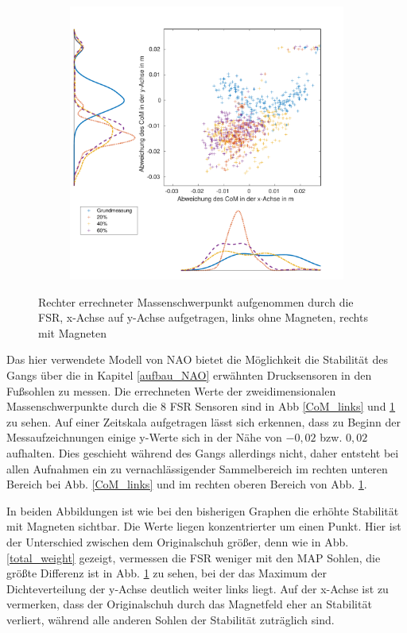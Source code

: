 \begin{figure}[tb]
\begin{adjustwidth}{-0.2\linewidth}{-0.2\linewidth}
\begin{subfigure}[c]{.45\linewidth}
			\includegraphics[width=\linewidth]{Bilder/rechts_CoM_mitM.pdf}
			\vspace{5pt}
		\end{subfigure}
	\end{adjustwidth}
	\caption{Rechter errechneter Massenschwerpunkt aufgenommen durch die FSR, x-Achse auf y-Achse aufgetragen, links ohne Magneten, rechts mit Magneten} \label{CoM_rechts}
\end{figure}
Das hier verwendete Modell von NAO bietet die Möglichkeit die Stabilität des Gangs über die in Kapitel \ref{aufbau_NAO} erwähnten Drucksensoren in den Fußsohlen zu messen. Die errechneten Werte der zweidimensionalen Massenschwerpunkte durch die 8 FSR Sensoren sind in Abb \ref{CoM_links} und \ref{CoM_rechts} zu sehen. Auf einer Zeitskala aufgetragen lässt sich erkennen, dass zu Beginn der Messaufzeichnungen einige y-Werte sich in der Nähe von $-0,02$ bzw. $0,02$ aufhalten. Dies geschieht während des Gangs allerdings nicht, daher entsteht bei allen Aufnahmen ein zu vernachlässigender Sammelbereich im rechten unteren Bereich bei Abb. \ref{CoM_links} und im rechten oberen Bereich von Abb. \ref{CoM_rechts}. 

In beiden Abbildungen ist wie bei den bisherigen Graphen die erhöhte Stabilität mit Magneten sichtbar. Die Werte liegen konzentrierter um einen Punkt. Hier ist der Unterschied zwischen dem Originalschuh größer, denn wie in Abb. \ref{total_weight} gezeigt, vermessen die FSR weniger mit den MAP Sohlen, die größte Differenz ist in Abb. \ref{CoM_rechts} zu sehen, bei der das Maximum der Dichteverteilung der y-Achse deutlich weiter links liegt. Auf der x-Achse ist zu vermerken, dass der Originalschuh durch das Magnetfeld eher an Stabilität verliert, während alle anderen Sohlen der Stabilität zuträglich sind.  

